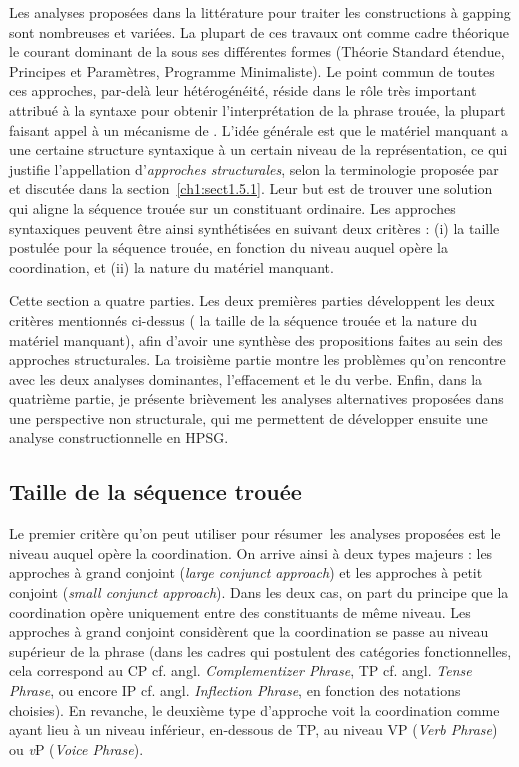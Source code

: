 Les analyses proposées dans la littérature pour traiter les constructions à gapping sont nombreuses et variées. La plupart de ces travaux ont comme cadre théorique le courant dominant de la  sous ses différentes formes (Théorie Standard étendue, Principes et Paramètres, Programme Minimaliste). Le point commun de toutes ces approches, par-delà leur hétérogénéité, réside dans le rôle très important attribué à la syntaxe pour obtenir l’interprétation de la phrase trouée, la plupart faisant appel à un mécanisme de . L’idée générale est que le matériel manquant a une certaine structure syntaxique à un certain niveau de la représentation, ce qui justifie l’appellation d'\textit{approches structurales}, selon la terminologie proposée par \citet{Merchant2009} et discutée dans la section~\ref{ch1:sect1.5.1}. Leur but est de trouver une solution qui aligne la séquence trouée sur un constituant ordinaire. Les approches syntaxiques peuvent être ainsi synthétisées en suivant deux critères : (i) la taille postulée pour la séquence trouée, en fonction du niveau auquel opère la coordination, et (ii) la nature du matériel manquant.  

Cette section a quatre parties. Les deux premières parties développent les deux critères mentionnés ci-dessus ({\cad} la taille de la séquence trouée et la nature du matériel manquant), afin d’avoir une synthèse des propositions faites au sein des approches structurales. La troisième partie montre les problèmes qu’on rencontre avec les deux analyses dominantes, l’effacement et le  du verbe. Enfin, dans la quatrième partie, je présente brièvement les analyses alternatives proposées dans une perspective non structurale, qui me permettent de développer ensuite une analyse constructionnelle en HPSG.


\subsection{Taille de la séquence trouée} \label{ch2:sect2.4.1}

Le premier critère qu’on peut utiliser pour résumer~les analyses proposées est le niveau auquel opère la coordination. On arrive ainsi à deux types majeurs : les approches à grand conjoint (\textit{large conjunct approach}) et les approches à petit conjoint (\textit{small conjunct approach}). Dans les deux cas, on part du principe que la coordination opère uniquement entre des constituants de même niveau. Les approches à grand conjoint considèrent que la coordination se passe au niveau supérieur de la phrase (dans les cadres qui postulent des catégories fonctionnelles, cela correspond au CP cf. angl. \textit{Complementizer Phrase}, TP cf. angl. \textit{Tense Phrase}, ou encore IP cf. angl. \textit{Inflection Phrase}, en fonction des notations choisies). En revanche, le deuxième type d’approche voit la coordination comme ayant lieu à un niveau inférieur, {\cad} en-dessous de TP, au niveau VP (\textit{Verb Phrase}) ou \textit{v}P (\textit{Voice Phrase}).  


